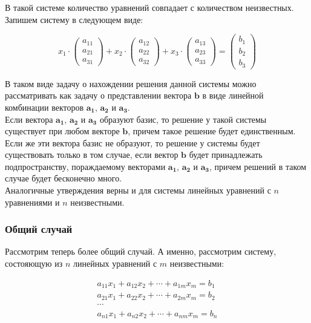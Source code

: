 \documentclass{article}
\begin{document}
В такой системе количество уравнений совпадает с количеством неизвестных. Запишем систему в следующем виде:

\[
	x_1 \cdot \begin{pmatrix} a_{11} \\ a_{21} \\ a_{31} \end{pmatrix} + 
	x_2 \cdot \begin{pmatrix} a_{12} \\ a_{22} \\ a_{32} \end{pmatrix} + 
	x_3 \cdot \begin{pmatrix} a_{13} \\ a_{23} \\ a_{33} \end{pmatrix} =
	\begin{pmatrix} b_1 \\ b_2 \\ b_3 \end{pmatrix} 
\]

В таком виде задачу о нахождении решения данной системы можно рассматривать как задачу о представлении вектора $\mathbf{b}$ в виде линейной комбинации векторов $\mathbf{a_1}$, $\mathbf{a_2}$ и $\mathbf{a_3}$. \\

Если вектора $\mathbf{a_1}$, $\mathbf{a_2}$ и $\mathbf{a_3}$ образуют базис, то решение у такой системы существует при любом векторе $\mathbf{b}$, причем такое решение будет единственным. Если же эти вектора базис не образуют, то решение у системы будет существовать только в том случае, если вектор $\mathbf{b}$ будет принадлежать подпространству, пораждаемому векторами $\mathbf{a_1}$, $\mathbf{a_2}$ и $\mathbf{a_3}$, причем решений в таком случае будет бесконечно много. \\

Аналогичные утверждения верны и для системы линейных уравнений с $n$ уравнениями и $n$ неизвестными. \\

\subsubsection{Общий случай}

Рассмотрим теперь более общий случай. А именно, рассмотрим систему, состояющую из $n$ линейных уравнений с $m$ неизвестными:

\[ \begin{array}{c}
	a_{11} x_{1} + a_{12} x_2 + \cdots + a_{1m} x_m = b_1 \\
	a_{21} x_{1} + a_{22} x_2 + \cdots + a_{2m} x_m = b_2 \\
	\cdots \\
	a_{n1} x_{1} + a_{n2} x_2 + \cdots + a_{nm} x_m = b_n \\
\end{array} \]
\end{document}
